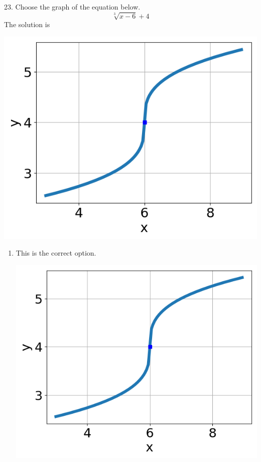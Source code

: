 \documentclass{article}[10pt]
\begin{document}
23. Choose the graph of the equation below.
$$ \sqrt[3]{x - 6} + 4 $$ 
The solution is  
\begin{center}\includegraphics[scale=0.5]{../Figures/question23MUA.png}\end{center}\begin{enumerate}[label=\Alph*.] 
\item This is the correct option. 
\begin{center}\includegraphics[scale=0.5]{../Figures/question23MUA.png}\end{center} 
 

\end{enumerate}
\end{document}
